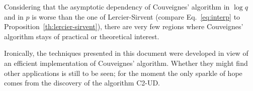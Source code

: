 Considering that the asymptotic dependency of Couveignes' algorithm in
$\log q$ and in $p$ is worse than the one of Lercier-Sirvent (compare
Eq.~\eqref{eq:interp} to Proposition~\ref{th:lercier-sirvent}), there
are very few regions where Couveignes' algorithm stays of practical or
theoretical interest.

Ironically, the techniques presented in this document were developed
in view of an efficient implementation of Couveignes'
algorithm. Whether they might find other applications is still to be
seen; for the moment the only sparkle of hope comes from the discovery
of the algorithm C2-UD.


%
